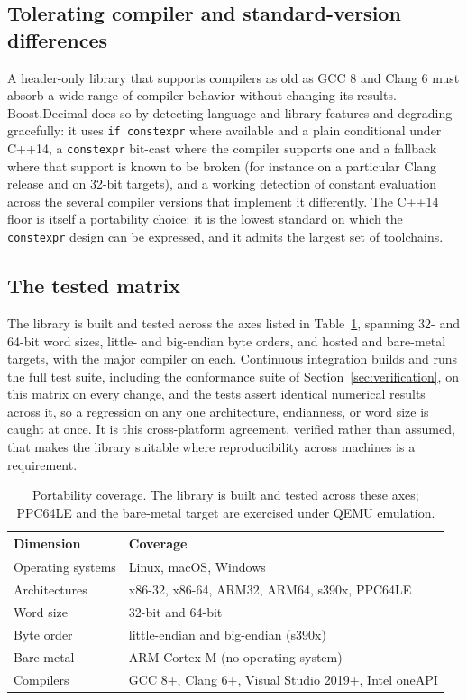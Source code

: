 \documentclass[acmsmall]{acmart}
\begin{document}
\subsection{Tolerating compiler and standard-version differences}
A header-only library that supports compilers as old as GCC 8 and Clang 6 must absorb a
wide range of compiler behavior without changing its results. Boost.Decimal does so by
detecting language and library features and degrading gracefully: it uses
\texttt{if constexpr} where available and a plain conditional under C++14, a
\texttt{constexpr} bit-cast where the compiler supports one and a fallback where that
support is known to be broken (for instance on a particular Clang release and on 32-bit
targets), and a working detection of constant evaluation across the several compiler
versions that implement it differently. The C++14 floor is itself a portability choice:
it is the lowest standard on which the \texttt{constexpr} design can be expressed, and it
admits the largest set of toolchains.

\subsection{The tested matrix}
The library is built and tested across the axes listed in Table~\ref{tab:platforms},
spanning 32- and 64-bit word sizes, little- and big-endian byte orders, and hosted and
bare-metal targets, with the major compiler on each. Continuous integration builds and
runs the full test suite, including the conformance suite of
Section~\ref{sec:verification}, on this matrix on every change, and the tests assert
identical numerical results across it, so a regression on any one architecture,
endianness, or word size is caught at once. It is this cross-platform agreement, verified
rather than assumed, that makes the library suitable where reproducibility across
machines is a requirement.

\begin{table}
  \caption{Portability coverage. The library is built and tested across these axes;
    PPC64LE and the bare-metal target are exercised under QEMU emulation.}
  \label{tab:platforms}
  \footnotesize
  \begin{tabular}{ll}
    \toprule
    Dimension & Coverage \\
    \midrule
    Operating systems & Linux, macOS, Windows \\
    Architectures     & x86-32, x86-64, ARM32, ARM64, s390x, PPC64LE \\
    Word size         & 32-bit and 64-bit \\
    Byte order        & little-endian and big-endian (s390x) \\
    Bare metal        & ARM Cortex-M (no operating system) \\
    Compilers         & GCC 8+, Clang 6+, Visual Studio 2019+, Intel oneAPI \\
    \bottomrule
  \end{tabular}
\end{table}
\end{document}
